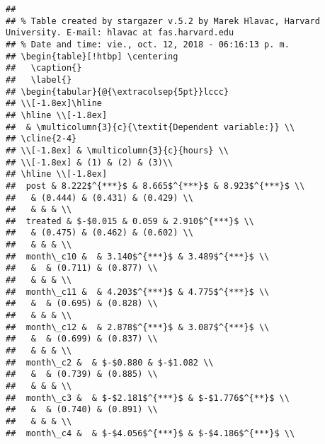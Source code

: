 \documentclass[11pt,]{article}
\begin{document}
\begin{verbatim}
## 
## % Table created by stargazer v.5.2 by Marek Hlavac, Harvard University. E-mail: hlavac at fas.harvard.edu
## % Date and time: vie., oct. 12, 2018 - 06:16:13 p. m.
## \begin{table}[!htbp] \centering 
##   \caption{} 
##   \label{} 
## \begin{tabular}{@{\extracolsep{5pt}}lccc} 
## \\[-1.8ex]\hline 
## \hline \\[-1.8ex] 
##  & \multicolumn{3}{c}{\textit{Dependent variable:}} \\ 
## \cline{2-4} 
## \\[-1.8ex] & \multicolumn{3}{c}{hours} \\ 
## \\[-1.8ex] & (1) & (2) & (3)\\ 
## \hline \\[-1.8ex] 
##  post & 8.222$^{***}$ & 8.665$^{***}$ & 8.923$^{***}$ \\ 
##   & (0.444) & (0.431) & (0.429) \\ 
##   & & & \\ 
##  treated & $-$0.015 & 0.059 & 2.910$^{***}$ \\ 
##   & (0.475) & (0.462) & (0.602) \\ 
##   & & & \\ 
##  month\_c10 &  & 3.140$^{***}$ & 3.489$^{***}$ \\ 
##   &  & (0.711) & (0.877) \\ 
##   & & & \\ 
##  month\_c11 &  & 4.203$^{***}$ & 4.775$^{***}$ \\ 
##   &  & (0.695) & (0.828) \\ 
##   & & & \\ 
##  month\_c12 &  & 2.878$^{***}$ & 3.087$^{***}$ \\ 
##   &  & (0.699) & (0.837) \\ 
##   & & & \\ 
##  month\_c2 &  & $-$0.880 & $-$1.082 \\ 
##   &  & (0.739) & (0.885) \\ 
##   & & & \\ 
##  month\_c3 &  & $-$2.181$^{***}$ & $-$1.776$^{**}$ \\ 
##   &  & (0.740) & (0.891) \\ 
##   & & & \\ 
##  month\_c4 &  & $-$4.056$^{***}$ & $-$4.186$^{***}$ \\ 

\end{verbatim}
\end{document}

